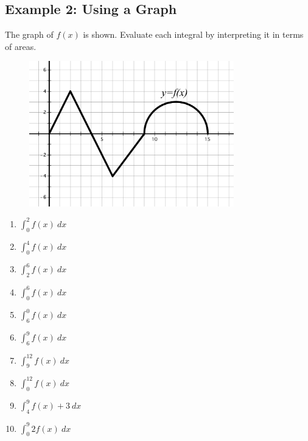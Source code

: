 \documentclass[10pt]{book}
\theoremstyle{definition}
\begin{document}
\subsection*{Example 2: Using a Graph}
The graph of $f(x)$ is shown. Evaluate each integral by interpreting it in terms of areas.
\begin{figure}[h!]
    \centering
    \includegraphics[width=3.5in]{signedareaEx1.png}
\end{figure}
\begin{multicols}{2}
    \begin{enumerate}[label=(\alph*)]
        \item $\displaystyle\int_0^2 f(x)\ dx$\vspace{1.5cm}
        \item $\displaystyle\int_0^4 f(x)\ dx$\vspace{1.5cm} \item $\displaystyle\int_2^6 f(x)\ dx$\vspace{1.5cm}
        \item $\displaystyle\int_0^6 f(x)\ dx$\vspace{1.5cm}
        \item $\displaystyle\int_6^0 f(x)\ dx$\vspace{1.5cm}
        \item $\displaystyle\int_6^9 f(x)\ dx$\vspace{1.5cm}
        \item $\displaystyle\int_9^{12} f(x)\ dx$\vspace{1.5cm}
        \item $\displaystyle\int_0^{12} f(x)\ dx$\vspace{1.5cm}
        \item $\displaystyle\int_4^9 f(x)+3\ dx$\vspace{1.5cm}
        \item $\displaystyle\int_0^9 2f(x)\ dx$\vspace{1.5cm}
    \end{enumerate}
    \end{multicols}
\clearpage
\end{document}
